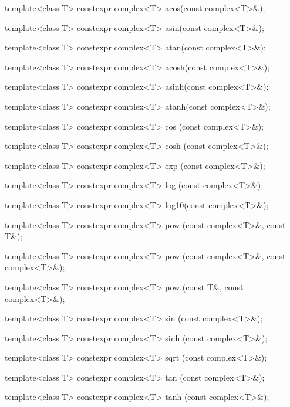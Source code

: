 \documentclass[prd,twocolumn,amsmath,amssymb,nofootinbib,eqsecnum]{revtex4-1}
\newcommand{\code}[1]{{\tt #1}}
\newcommand{\highlight}[1]{{\color{red} #1}}
\begin{document}
\code{

\vspace{2ex}
  template<class T> \highlight{constexpr} complex<T> acos(const complex<T>\&);

  template<class T> \highlight{constexpr} complex<T> asin(const complex<T>\&);

  template<class T> \highlight{constexpr} complex<T> atan(const complex<T>\&);

\vspace{2ex}

  template<class T> \highlight{constexpr} complex<T> acosh(const complex<T>\&);

  template<class T> \highlight{constexpr} complex<T> asinh(const complex<T>\&);

  template<class T> \highlight{constexpr} complex<T> atanh(const complex<T>\&);

\vspace{2ex}

  template<class T> \highlight{constexpr} complex<T> cos  (const complex<T>\&);

  template<class T> \highlight{constexpr} complex<T> cosh (const complex<T>\&);

  template<class T> \highlight{constexpr} complex<T> exp  (const complex<T>\&);

  template<class T> \highlight{constexpr} complex<T> log  (const complex<T>\&);

  template<class T> \highlight{constexpr} complex<T> log10(const complex<T>\&);

\vspace{2ex}

  template<class T> \highlight{constexpr} complex<T> pow  (const complex<T>\&, const T\&);

  template<class T> \highlight{constexpr} complex<T> pow  (const complex<T>\&, const complex<T>\&);

  template<class T> \highlight{constexpr} complex<T> pow  (const T\&, const complex<T>\&);

\vspace{2ex}

  template<class T> \highlight{constexpr} complex<T> sin  (const complex<T>\&);

  template<class T> \highlight{constexpr} complex<T> sinh (const complex<T>\&);

  template<class T> \highlight{constexpr} complex<T> sqrt (const complex<T>\&);

  template<class T> \highlight{constexpr} complex<T> tan  (const complex<T>\&);

  template<class T> \highlight{constexpr} complex<T> tanh (const complex<T>\&);
}
\end{document}
